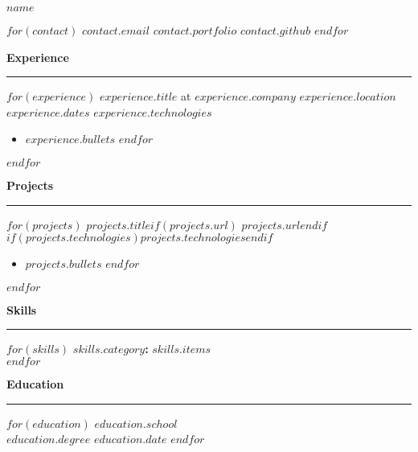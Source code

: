 \documentclass[11pt,a4paper]{article}
\newcommand{\name}[1]{\begin{center}\Huge\textbf{#1}\end{center}}
\newcommand{\contact}[1]{\begin{center}#1\end{center}\vspace{0.5em}}
\newcommand{\sectiontitle}[1]{\vspace{1em}\noindent\textbf{\large #1}\vspace{0.5em}\hrule\vspace{0.5em}}
\begin{document}
\name{$name$}

\contact{
    $for(contact)$
    $contact.email$ \quad
    $contact.portfolio$ \quad
    $contact.github$
    $endfor$
}

\sectiontitle{Experience}
$for(experience)$
\textbf{$experience.title$} at \textbf{$experience.company$} \hfill $experience.location$ \\
$experience.dates$ \hfill \textit{$experience.technologies$}
\begin{itemize}
$for(experience.bullets)$
    \item $experience.bullets$
$endfor$
\end{itemize}
$endfor$

\sectiontitle{Projects}
$for(projects)$
\textbf{$projects.title$}$if(projects.url)$ \hfill $projects.url$$endif$ \\
$if(projects.technologies)$\textit{$projects.technologies$}$endif$
\begin{itemize}
$for(projects.bullets)$
    \item $projects.bullets$
$endfor$
\end{itemize}
$endfor$

\sectiontitle{Skills}
$for(skills)$
\textbf{$skills.category$:} $skills.items$ \\
$endfor$

\sectiontitle{Education}
$for(education)$
\textbf{$education.school$} \\
$education.degree$ \hfill $education.date$
$endfor$
\end{document}
